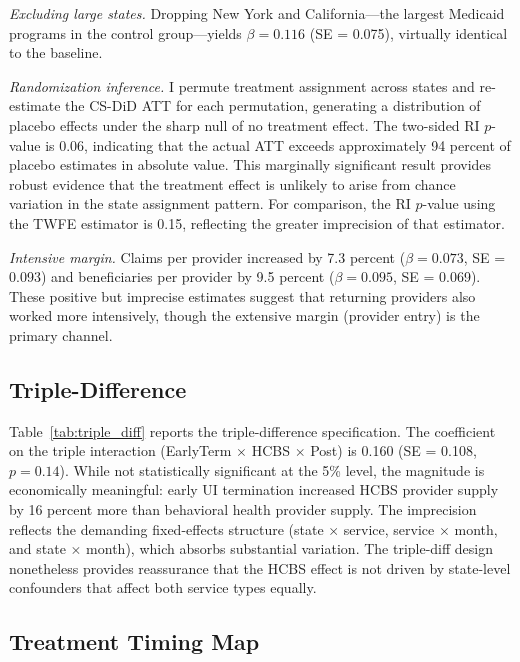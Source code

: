 \documentclass[12pt]{article}
\begin{document}
\textit{Excluding large states.} Dropping New York and California---the largest Medicaid programs in the control group---yields $\beta = 0.116$ (SE = 0.075), virtually identical to the baseline.

\textit{Randomization inference.} I permute treatment assignment across states and re-estimate the CS-DiD ATT for each permutation, generating a distribution of placebo effects under the sharp null of no treatment effect. The two-sided RI $p$-value is 0.06, indicating that the actual ATT exceeds approximately 94 percent of placebo estimates in absolute value. This marginally significant result provides robust evidence that the treatment effect is unlikely to arise from chance variation in the state assignment pattern. For comparison, the RI $p$-value using the TWFE estimator is 0.15, reflecting the greater imprecision of that estimator.

\textit{Intensive margin.} Claims per provider increased by 7.3 percent ($\beta = 0.073$, SE = 0.093) and beneficiaries per provider by 9.5 percent ($\beta = 0.095$, SE = 0.069). These positive but imprecise estimates suggest that returning providers also worked more intensively, though the extensive margin (provider entry) is the primary channel.



\subsection{Triple-Difference}

Table~\ref{tab:triple_diff} reports the triple-difference specification. The coefficient on the triple interaction (EarlyTerm $\times$ HCBS $\times$ Post) is 0.160 (SE = 0.108, $p = 0.14$). While not statistically significant at the 5\% level, the magnitude is economically meaningful: early UI termination increased HCBS provider supply by 16 percent more than behavioral health provider supply. The imprecision reflects the demanding fixed-effects structure (state $\times$ service, service $\times$ month, and state $\times$ month), which absorbs substantial variation. The triple-diff design nonetheless provides reassurance that the HCBS effect is not driven by state-level confounders that affect both service types equally.



\subsection{Treatment Timing Map}
\end{document}
